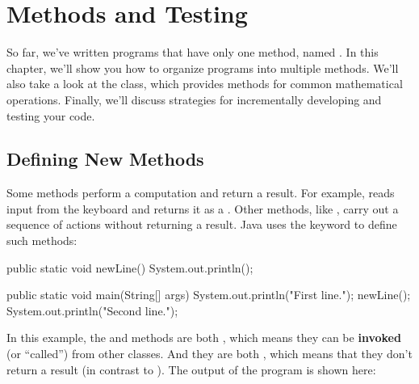 \chapter{Methods and Testing}

So far, we've written programs that have only one method, named .
In this chapter, we'll show you how to organize programs into multiple methods.
We'll also take a look at the  class, which provides methods for common mathematical operations.
Finally, we'll discuss strategies for incrementally developing and testing your code.



\section{Defining New Methods}
\label{adding_methods}

Some methods perform a computation and return a result.
For example,  reads input from the keyboard and returns it as a .
Other methods, like , carry out a sequence of actions without returning a result.
Java uses the keyword  to define such methods:


\begin{code}
public static void newLine() {
    System.out.println();
}

public static void main(String[] args) {
    System.out.println("First line.");
    newLine();
    System.out.println("Second line.");
}
\end{code}


In this example, the  and  methods are both , which means they can be {\bf invoked} (or ``called'') from other classes.
And they are both , which means that they don't return a result (in contrast to ).
The output of the program is shown here:

